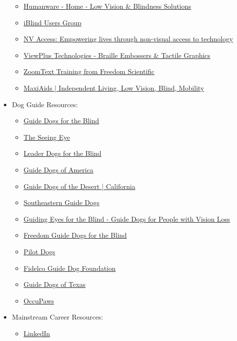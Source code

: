 \begin{itemize}[leftmargin=*]
\begin{itemize}
\item \href{https://support.humanware.com/en-usa/support}{Humanware - Home - Low Vision \& Blindness Solutions}
\item \href{http://www.ibugtoday.com/}{iBlind Users Group}
\item \href{https://www.nvaccess.org/}{NV Access: Empowering lives through non-visual access to technology}
\item \href{https://viewplus.com/#main}{ViewPlus Technologies - Braille Embossers \& Tactile Graphics}
\item \href{https://www.freedomscientific.com/training/zoomtext/}{ZoomText Training from Freedom Scientific}
\item \href{https://www.maxiaids.com/}{MaxiAids | Independent Living, Low Vision, Blind, Mobility}
\end{itemize}
\item Dog Guide Resources:
\begin{itemize}
\item \href{https://www.guidedogs.com/}{Guide Dogs for the Blind}
\item \href{https://www.seeingeye.org/}{The Seeing Eye}
\item \href{https://www.leaderdog.org/}{Leader Dogs for the Blind}
\item \href{https://www.guidedogsofamerica.org/}{Guide Dogs of America}
\item \href{https://guidedogsofthedesert.org/}{Guide Dogs of the Desert | California}
\item \href{https://www.guidedogs.org/#content}{Southeastern Guide Dogs}
\item \href{https://www.guidingeyes.org/}{Guiding Eyes for the Blind - Guide Dogs for People with Vision Loss}
\item \href{http://www.freedomguidedogs.com/}{Freedom Guide Dogs for the Blind}
\item \href{https://fidelco.org/}{Pilot Dogs}
\item \href{https://fidelco.org/}{Fidelco Guide Dog Foundation}
\item \href{https://guidedogsoftexas.org/}{Guide Dogs of Texas}
\item \href{https://occupaws.org/}{OccuPaws}
\end{itemize}
\item Mainstream Career Resources:
\begin{itemize}
\item \href{https://www.linkedin.com/check/add-phone?country_code=us}{LinkedIn}

\end{itemize}
\end{itemize}
